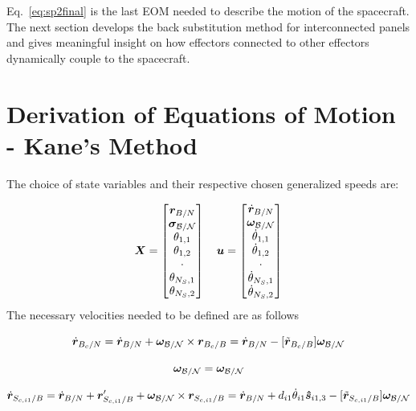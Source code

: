 \documentclass[paper]{aiaaNew}
\begin{document}
Eq.~\eqref{eq:sp2final} is the last EOM needed to describe the motion of the spacecraft. The next section develops the back substitution method for interconnected panels and gives meaningful insight on how effectors connected to other effectors dynamically couple to the spacecraft. 

\section{Derivation of Equations of Motion - Kane's Method}

The choice of state variables and their respective chosen generalized speeds are:

\begin{equation}
\bm X = 
\begin{bmatrix}
\bm r_{B/N}\\
\bm \sigma_{\cal{B/N}}\\
\theta_{1,1}\\
\theta_{1,2}\\
\cdot\\
\theta_{N_S,1}\\
\theta_{N_S,2}
\end{bmatrix}
\quad
\bm u = \begin{bmatrix}
\dot{\bm r}_{B/N}\\
\bm \omega_{\cal{B/N}}\\
\dot{\theta}_{1,1}\\
\dot{\theta}_{1,2}\\
\cdot\\
\dot{\theta}_{N_S,1}\\
\dot{\theta}_{N_S,2}
\end{bmatrix}
\end{equation} 	
The necessary velocities needed to be defined are as follows

\begin{equation}
\dot{\bm r}_{B_c/N} = \dot{\bm r}_{B/N} + \bm \omega_{\cal{B/N}} \times {\bm r}_{B_c/B} = \dot{\bm r}_{B/N}  - [\tilde{{\bm r}}_{B_c/B}] \bm \omega_{\cal{B/N}} \\
\end{equation}

\begin{equation}
\bm \omega_{\cal{B/N}} = \bm \omega_{\cal{B/N}}
\end{equation}

\begin{equation}
\dot{\bm{r}}_{S_{c,{i1}}/B} = \dot{\bm r}_{B/N} + \bm{r}'_{S_{c,{i1}}/B} + \bm \omega_{\cal{B/N}} \times \bm{r}_{S_{c,{i1}}/B} = \dot{\bm r}_{B/N} + d_{i1} \dot{\theta}_{i1} \bm{\hat{s}}_{i1,3}  - [\tilde{\bm{r}}_{S_{c,{i1}}/B}] \bm \omega_{\cal{B/N}}
\end{equation}
\end{document}
